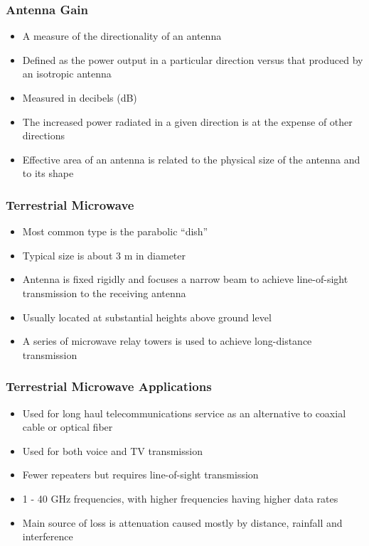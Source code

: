 \documentclass[pdflatex,compress]{beamer}
\begin{document}
\begin{frame}
	\frametitle{Antenna Gain}
	\begin{itemize}
		\item A measure of the directionality of an antenna
		\item Defined as the power output in a particular direction versus that produced by an isotropic antenna
		\item Measured in decibels (dB)
		\item The increased power radiated in a given direction is at the expense of other directions
		\item Effective area of an antenna is related to the physical size of the antenna and to its shape
	\end{itemize}
\end{frame}

\begin{frame}
	\frametitle{Terrestrial Microwave}
	\begin{itemize}
		\item Most common type is the parabolic “dish”
		\item Typical size is about 3 m in diameter
		\item Antenna is fixed rigidly and focuses a narrow beam to achieve line-of-sight transmission to the receiving antenna
		\item Usually located at substantial heights above ground level
		\item A series of microwave relay towers is used to achieve long-distance transmission
	\end{itemize}
\end{frame}

\begin{frame}
	\frametitle{Terrestrial Microwave Applications}
	\begin{itemize}
		\item Used for long haul telecommunications service as an alternative to coaxial cable or optical fiber
		\item Used for both voice and TV transmission
		\item Fewer repeaters but requires line-of-sight transmission
		\item 1 - 40 GHz frequencies, with higher frequencies having higher data rates
		\item Main source of loss is attenuation caused mostly by distance, rainfall and interference
	\end{itemize}
\end{frame}
\end{document}
